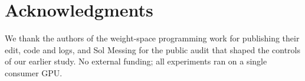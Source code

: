 \documentclass[11pt]{article}
\begin{document}
\section*{Acknowledgments}

We thank the authors of the weight-space programming work for publishing their edit, code and logs, and Sol Messing for the public audit that shaped the controls of our earlier study. No external funding; all experiments ran on a single consumer GPU.



\end{document}
